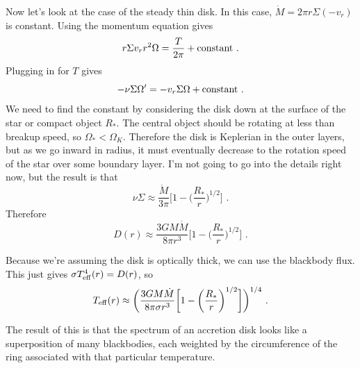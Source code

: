 \begin{enumerate}
Now let's look at the case of the steady thin disk. In this case, $\dot{M} = 2 \pi r \Sigma (-v_r)$ is constant. Using the momentum equation gives
\begin{equation}
r \Sigma v_r r^2 \Omega = \frac{T}{2 \pi} + {\rm constant}\,\,.
\end{equation}
Plugging in for $T$ gives
\begin{equation}
-\nu \Sigma \Omega^\prime = -v_r\Sigma \Omega + {\rm constant}\,\,.
\end{equation}
We need to find the constant by considering the disk down at the surface of the star or compact object $R_*$. The central object should be rotating at less than breakup speed, so $\Omega_* < \Omega_K$. Therefore the disk is Keplerian in the outer layers, but as we go inward in radius, it must eventually decrease to the rotation speed of the star over some boundary layer. I'm not going to go into the details right now, but the result is that
\begin{equation}
\nu\Sigma \approx \frac{\dot{M}}{3\pi} \biggl[ 1 - \biggl(\frac{R_*}{r}\biggr)^{1/2}\biggr]\,\,.
\end{equation}
Therefore
\begin{equation}
D(r) \approx \frac{3GM\dot{M}}{8\pi r^3} \biggl[ 1 - \biggl(\frac{R_*}{r}\biggr)^{1/2}\biggr]\,\,.
\end{equation}

      Because we're assuming the disk is optically thick, we can use the blackbody flux. This just gives $\sigma T_{\rm eff}^4(r) = D(r)$, so
      \begin{equation}
      T_{\rm eff}(r) \approx \biggl(\frac{3GM\dot{M}}{8\pi \sigma r^3} \biggl[ 1 - \biggl(\frac{R_*}{r}\biggr)^{1/2}\biggr]\biggr)^{1/4}\,\,.
      \end{equation}
      
      The result of this is that the spectrum of an accretion disk looks like a superposition of many blackbodies, each weighted by the circumference of the ring associated with that particular temperature.
      

\end{enumerate}
